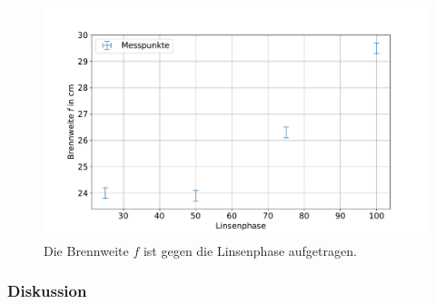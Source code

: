 \documentclass[
	a4paper,
	12pt,
	pagesize,
	ngerman
]{scrartcl}
\begin{document}
\begin{figure}[H] %
			\includegraphics[width=0.8\linewidth]{img/fresnel}
			\caption{
			Die Brennweite $f$ ist gegen die Linsenphase aufgetragen.
			}
			\label{fig_fresnel}
	\end{figure}
			\subsubsection*{Diskussion}
\end{document}
